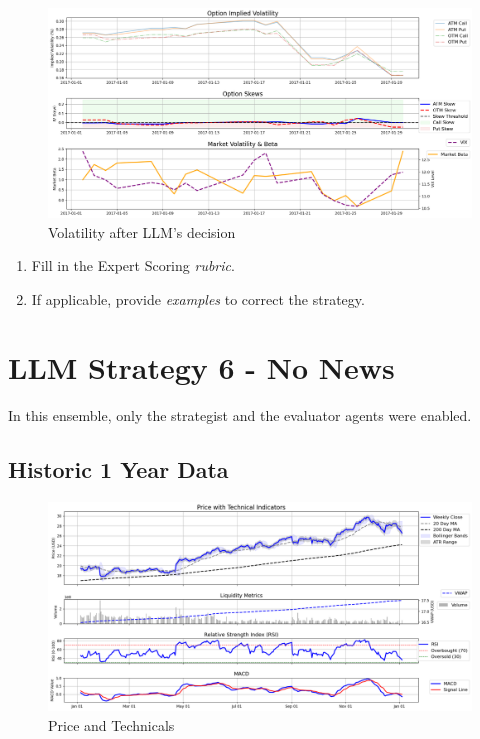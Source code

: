 \documentclass[8pt]{scrartcl}
\begin{document}
\begin{figure}[H]
    \centering
    \includegraphics[width=1\linewidth]{judge_reviews/GOOGL_M_gpt-4o-mini/2017-01-02/llm_Market_Volatility_&_Beta.png}
    \caption{Volatility after LLM's decision}
\end{figure}

\begin{tcolorbox}[colback=blue!10, colframe=blue!60, title=\textbf{TASKS}, sharp corners=southwest]
\begin{enumerate}
    \item Fill in the Expert Scoring \textit{rubric}.
    \item If applicable, provide \textit{examples} to correct the strategy.
\end{enumerate}
\end{tcolorbox}
\newpage


\section*{LLM Strategy 6 - No News}
\label{app:s6}

In this ensemble, only the strategist and the evaluator agents were enabled.

\subsection*{Historic 1 Year Data}

\begin{figure}[H]
    \centering
    \includegraphics[width=1\linewidth]{judge_reviews/AAPL_M_gpt-4o-mini//2015-01-05/judge_Price_with_Technical_Indicators.png}
    \caption{Price and Technicals}
\end{figure}
\end{document}
